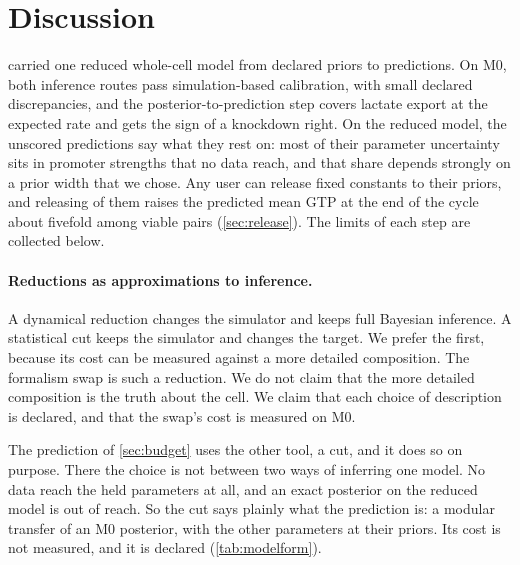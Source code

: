 \section{Discussion}
\label{sec:discussion}

\IC{} carried one reduced whole-cell model from declared priors to predictions. On M0, both
inference routes pass simulation-based calibration, with small declared discrepancies, and the
posterior-to-prediction step covers lactate export at the expected rate and gets the sign of a
knockdown right. On the reduced model, the unscored predictions say what they rest on: most of
their parameter uncertainty sits in promoter strengths that no data reach, and that share depends
strongly on a prior width that we chose. Any user can release fixed constants to their priors,
and releasing  of them raises the predicted mean GTP at the end of the cycle
about fivefold among viable pairs (\cref{sec:release}). The limits of each step are collected
below.

\paragraph{Reductions as approximations to inference.} A dynamical reduction changes
the simulator and keeps full Bayesian inference. A statistical cut keeps the
simulator and changes the target. We prefer the first, because its cost can be
measured against a more detailed composition. The formalism swap is such a reduction.
We do not claim that the more detailed composition is the truth about the cell. We claim that each choice of description is declared, and that the swap's cost is measured on M0.

The prediction of \cref{sec:budget} uses the other tool, a cut, and it does so on
purpose. There the choice is not between two ways of inferring one model. No data
reach the held parameters at all, and an exact posterior on the reduced model is out of
reach. So the cut says plainly what the prediction is: a modular transfer of an M0
posterior, with the other parameters at their priors. Its cost is not measured, and it
is declared (\cref{tab:modelform}).


